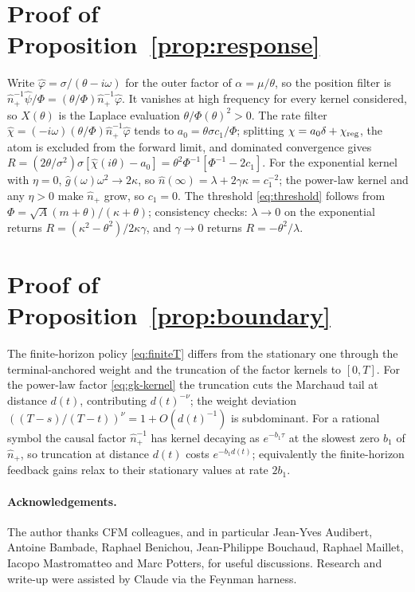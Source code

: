 \documentclass[11pt]{article}
\theoremstyle{plain}
\theoremstyle{definition}
\theoremstyle{remark}
\begin{document}
\section{Proof of Proposition~\ref{prop:response}}\label{app:C}
Write $\hat\varphi=\sigma/(\theta-i\omega)$ for the outer factor of $\alpha=\mu/\theta$, so the position filter is $\hat n_+^{-1}\hat\psi/\Phi=(\theta/\Phi)\hat n_+^{-1}\hat\varphi$. It vanishes at high frequency for every kernel considered, so $X(\theta)$ is the Laplace evaluation $\theta/\Phi(\theta)^2>0$. The rate filter $\hat\chi=(-i\omega)(\theta/\Phi)\hat n_+^{-1}\hat\varphi$ tends to $a_0=\theta\sigma c_1/\Phi$; splitting $\chi=a_0\delta+\chi_{\rm reg}$, the atom is excluded from the forward limit, and dominated convergence gives $R=(2\theta/\sigma^2)\sigma[\hat\chi(i\theta)-a_0]=\theta^2\Phi^{-1}[\Phi^{-1}-2c_1]$. For the exponential kernel with $\eta=0$, $\hat g(\omega)\omega^2\to2\kappa$, so $\hat n(\infty)=\lambda+2\gamma\kappa=c_1^{-2}$; the power-law kernel and any $\eta>0$ make $\hat n_+$ grow, so $c_1=0$. The threshold \eqref{eq:threshold} follows from $\Phi=\sqrt A(m+\theta)/(\kappa+\theta)$; consistency checks: $\lambda\to0$ on the exponential returns $R=(\kappa^2-\theta^2)/2\kappa\gamma$, and $\gamma\to0$ returns $R=-\theta^2/\lambda$.

\section{Proof of Proposition~\ref{prop:boundary}}\label{app:D}
The finite-horizon policy \eqref{eq:finiteT} differs from the stationary one through the terminal-anchored weight and the truncation of the factor kernels to $[0,T]$. For the power-law factor \eqref{eq:gk-kernel} the truncation cuts the Marchaud tail at distance $d(t)$, contributing $d(t)^{-\nu}$; the weight deviation $((T-s)/(T-t))^\nu=1+O(d(t)^{-1})$ is subdominant. For a rational symbol the causal factor $\hat n_+^{-1}$ has kernel decaying as $e^{-b_1\tau}$ at the slowest zero $b_1$ of $\hat n_+$, so truncation at distance $d(t)$ costs $e^{-b_1 d(t)}$; equivalently the finite-horizon feedback gains relax to their stationary values at rate $2b_1$.

\paragraph{Acknowledgements.} The author thanks CFM colleagues, and in particular Jean-Yves Audibert, Antoine Bambade, Raphael Benichou, Jean-Philippe Bouchaud, Raphael Maillet, Iacopo Mastromatteo and Marc Potters, for useful discussions. Research and write-up were assisted by Claude via the Feynman harness. 



\end{document}
